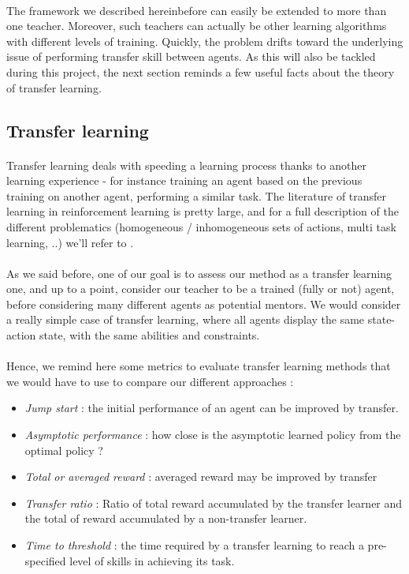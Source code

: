\documentclass[a4paper]{report}
\begin{document}
{{{				\paragraph{} The framework we described hereinbefore can easily be extended to more than one teacher. Moreover, such teachers can actually be other learning algorithms with different levels of training. Quickly, the problem drifts toward the underlying issue of performing transfer skill between agents. As this will also be tackled during this project, the next section reminds a few useful facts about the theory of transfer learning. 
			}
			\subsection{Transfer learning}
			{
				\paragraph{} Transfer learning deals with speeding a learning process thanks to another learning experience - for instance training an agent based on the previous training on another agent, performing a similar task. The literature of transfer learning in reinforcement learning is pretty large, and for a full description of the different problematics (homogeneous / inhomogeneous sets of actions, multi task learning, ..) we'll refer to \cite{taylor2009transfer}. 
				
				\paragraph{} As we said before, one of our goal is to assess our method as a transfer learning one, and up to a point, consider our teacher to be a trained (fully or not) agent, before considering many different agents as potential mentors. We would consider a really simple case of transfer learning, where all agents display the same state-action state, with the same abilities and constraints. 
				
				\paragraph{} Hence, we remind here some metrics to evaluate transfer learning methods that we would have to use to compare our different approaches : 
				\begin{itemize}
					\item \emph{Jump start} : the initial performance of an agent can be improved by transfer. 
					\item \emph{Asymptotic performance} : how close is the asymptotic learned policy from the optimal policy ? 
					\item \emph{Total or averaged reward} : averaged reward may be improved by transfer 
					\item \emph{Transfer ratio} : Ratio of total reward accumulated by the transfer learner and the total of reward accumulated by a non-transfer learner. 
					\item \emph{Time to threshold} : the time required by a transfer learning to reach a pre-specified level of skills in achieving its task. 
				\end{itemize}
				
}}}
\end{document}
